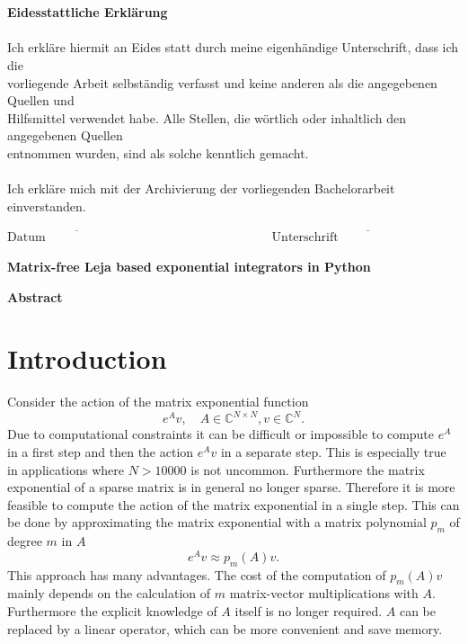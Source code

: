 \documentclass{scrartcl}
\begin{document}
{\begin{figure}[!htp]
\begin{flushright}
\end{flushright}
\end{figure}\\\\
{\Large\textbf{Eidesstattliche Erklärung}}\\\\
Ich erkläre hiermit an Eides statt durch meine eigenhändige Unterschrift, dass ich die\\ vorliegende Arbeit selbständig verfasst und keine anderen als die angegebenen Quellen und\\ Hilfsmittel verwendet habe. Alle Stellen, die wörtlich oder inhaltlich den angegebenen Quellen \\entnommen wurden, sind als solche kenntlich gemacht.\\\\
Ich erkläre mich mit der Archivierung der vorliegenden Bachelorarbeit einverstanden.
\vspace{40pt}\\
\begin{center}
\ensuremath{\overline{\mbox{Datum}\hspace{8em}}
    \hspace{10em}
    \overline{\mbox{Unterschrift}\hspace{10em}}
}
\thispagestyle{empty}
\end{center}}
\pagebreak



\begin{center}\textbf{\Huge Matrix-free Leja based exponential integrators in Python}\end{center}
\begin{center}\textbf{Abstract}\end{center}
\begin{abstract}

\end{abstract}

\setcounter{page}{1}

\section{Introduction}
Consider the action of the matrix exponential function 
	\[e^Av,\quad A\in\mathbb{C}^{N\times N}, v\in\mathbb{C}^N.\] 
Due to computational constraints it can be difficult or impossible to compute $e^A$ in a first step and then the action $e^Av$ in a separate step. This is especially true in applications where $N>10000$ is not uncommon. Furthermore the matrix exponential of a sparse matrix is in general no longer sparse. Therefore it is more feasible to compute the action of the matrix exponential in a single step. This can be done by approximating the matrix exponential with a matrix polynomial $p_m$ of degree $m$ in $A$
	\[e^Av \approx p_m(A)v.\]
This approach has many advantages. The cost of the computation of $p_m(A)v$ mainly depends on the calculation of $m$ matrix-vector multiplications with $A$. Furthermore the explicit knowledge of $A$ itself is no longer required. $A$ can be replaced by a linear operator, which can be more convenient and save memory.
\end{document}
